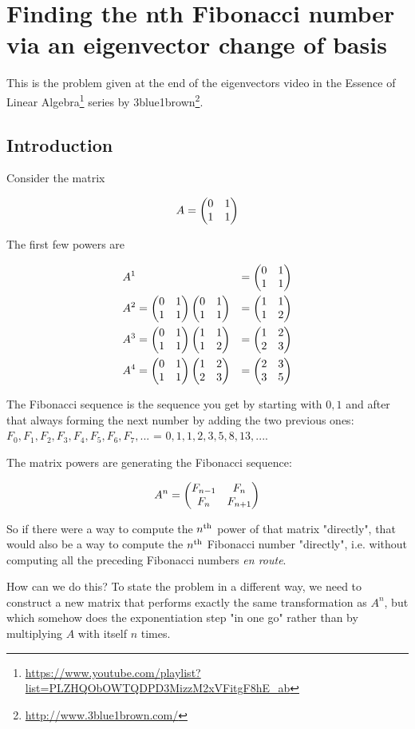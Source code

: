 \section{Finding the nth Fibonacci number via an eigenvector change of basis}


This is the problem given at the end of the eigenvectors video in the
Essence of Linear Algebra\footnote{\url{https://www.youtube.com/playlist?list=PLZHQObOWTQDPD3MizzM2xVFitgF8hE_ab}}
series by 3blue1brown\footnote{\url{http://www.3blue1brown.com/}}.


\subsection*{Introduction}

Consider the matrix

$$
A = \begin{pmatrix}0 & 1\\1 & 1\\ \end{pmatrix}
$$

The first few powers are

\begin{align*}
&A^{1} &= \begin{pmatrix}0 & 1\\1 & 1\\ \end{pmatrix}
\\
&A^{2} = \begin{pmatrix}0 & 1\\1 & 1\\ \end{pmatrix} \begin{pmatrix}0 & 1\\1 & 1\\ \end{pmatrix} &= \begin{pmatrix}1 & 1\\1 & 2\\ \end{pmatrix}
\\
&A^{3} = \begin{pmatrix}0 & 1\\1 & 1\\ \end{pmatrix} \begin{pmatrix}1 & 1\\1 & 2\\ \end{pmatrix} &= \begin{pmatrix}1 & 2\\2 & 3\\ \end{pmatrix}
\\
&A^{4} = \begin{pmatrix}0 & 1\\1 & 1\\ \end{pmatrix} \begin{pmatrix}1 & 2\\2 & 3\\ \end{pmatrix} &= \begin{pmatrix}2 & 3\\3 & 5\\ \end{pmatrix}
\end{align*}

The Fibonacci sequence is the sequence you get by starting with $0,
1$ and after that always forming the next number by adding the two previous ones:
$F_0, F_1, F_2, F_3, F_4, F_5, F_6, F_7, ...$ = $0, 1, 1, 2, 3, 5, 8, 13, ...$.

The matrix powers are generating the Fibonacci sequence:

$$
A^{n} = \begin{pmatrix}F_{n-1}  & F_n      \\F_n      & F_{n+1} \\ \end{pmatrix}
$$

So if there were a way to compute the $n^{\text{th}}$ power of that matrix "directly",
that would also be a way to compute the $n^{\text{th}}$ Fibonacci number "directly",
i.e. without computing all the preceding Fibonacci numbers \textit{en route}.

How can we do this? To state the problem in a different way, we need to
construct a new matrix that performs exactly the same transformation as $A^n$,
but which somehow does the exponentiation step "in one go" rather than by
multiplying $A$ with itself $n$ times.

